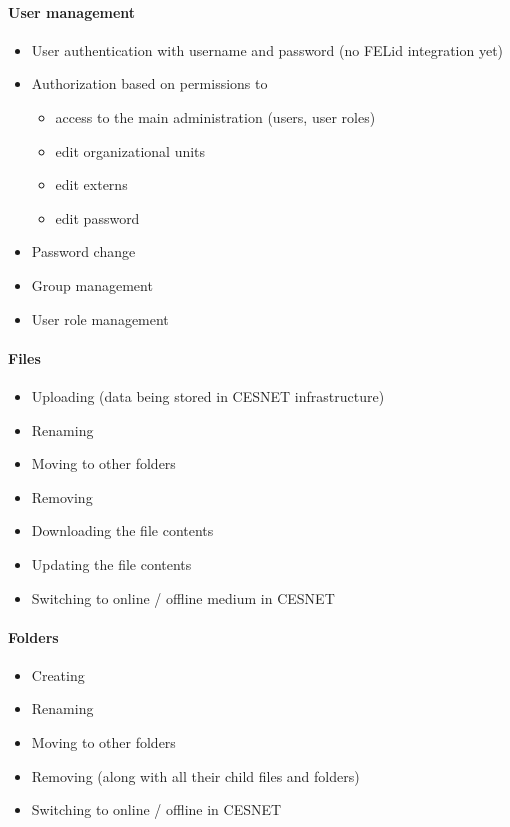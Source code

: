 \documentclass{book}
\begin{document}
\paragraph{User management}\label{user-management}

\begin{itemize}
\tightlist
\item
  User authentication with username and password (no FELid integration
  yet)
\item
  Authorization based on permissions to

  \begin{itemize}
  \tightlist
  \item
    access to the main administration (users, user roles)
  \item
    edit organizational units
  \item
    edit externs
  \item
    edit password
  \end{itemize}
\item
  Password change
\item
  Group management
\item
  User role management
\end{itemize}

\paragraph{Files}\label{files}

\begin{itemize}
\tightlist
\item
  Uploading (data being stored in CESNET infrastructure)
\item
  Renaming
\item
  Moving to other folders
\item
  Removing
\item
  Downloading the file contents
\item
  Updating the file contents
\item
  Switching to online / offline medium in CESNET
\end{itemize}

\paragraph{Folders}\label{folders}

\begin{itemize}
\tightlist
\item
  Creating
\item
  Renaming
\item
  Moving to other folders
\item
  Removing (along with all their child files and folders)
\item
  Switching to online / offline in CESNET
\end{itemize}
\end{document}
